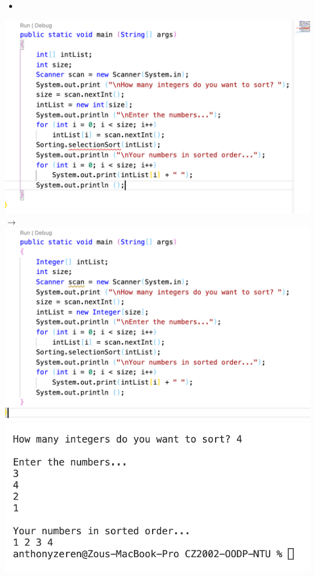 \documentclass[hidelinks,12pt]{article}
\begin{document}
\begin{itemize}
    \item[] 
\end{itemize}
\includegraphics[scale=0.35]{NumbersBef.png}
$\longrightarrow$ \includegraphics[scale=0.35]{NumbersCode.png}
\\ \includegraphics[scale=0.6]{NumbersResult.png}
\end{document}
